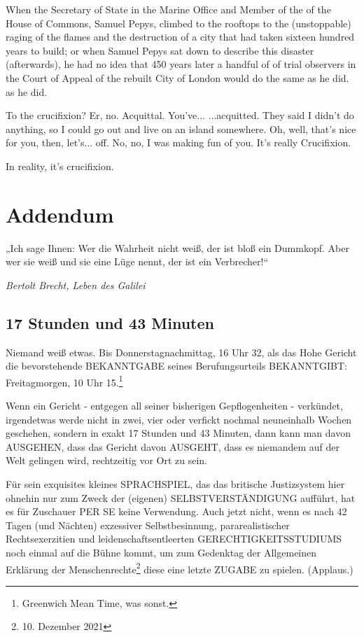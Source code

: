 \begin{multicols}{2}
When the Secretary of State in the Marine Office and Member of the
of the House of Commons, Samuel Pepys, climbed to the rooftops to
the (unstoppable) raging of the flames and the destruction of a city that had taken sixteen hundred years to build; or
when Samuel Pepys sat down to describe this disaster
(afterwards), he had no idea that 450 years later a handful of
of trial observers in the Court of Appeal of the rebuilt City of London would do the same as he did.
as he did.

To the crucifixion? Er, no. Acquittal. You've...
...acquitted. They said I didn't do anything,
so I could go out and live on an island somewhere. Oh, well, that's nice for you, then, let's...
off. No, no, I was making fun of you. It's really Crucifixion.

In reality, it's crucifixion.



\chapter{Addendum}

\epigraph{„Ich sage Ihnen: Wer die Wahrheit nicht weiß, der ist bloß ein Dummkopf. Aber wer sie weiß und sie eine Lüge nennt, der ist ein Verbrecher!“}{\textit{Bertolt Brecht, Leben des Galilei}}


\section{17 Stunden und 43 Minuten}

Niemand weiß etwas. Bis Donnerstagnachmittag, 16 Uhr
32, als das Hohe Gericht die bevorstehende BEKANNTGABE seines Berufungsurteils BEKANNTGIBT: Freitagmorgen, 10 Uhr 15.\footnote[25]{Greenwich Mean Time, was sonst.}

Wenn ein Gericht - entgegen all seiner bisherigen Gepflogenheiten - verkündet, irgendetwas werde nicht in
zwei, vier oder verfickt nochmal neuneinhalb Wochen
geschehen, sondern in exakt 17 Stunden und 43 Minuten, dann kann man davon AUSGEHEN, dass das Gericht davon AUSGEHT, dass es niemandem auf der Welt
gelingen wird, rechtzeitig vor Ort zu sein.

Für sein exquisites kleines SPRACHSPIEL, das das britische Justizsystem hier ohnehin nur zum Zweck der
(eigenen) SELBSTVERSTÄNDIGUNG aufführt, hat es für
Zuschauer PER SE keine Verwendung. Auch jetzt nicht,
wenn es nach 42 Tagen (und Nächten) exzessiver Selbstbesinnung, pararealistischer Rechtsexerzitien und leidenschaftsentleerten
GERECHTIGKEITSSTUDIUMS
noch einmal auf die Bühne kommt, um zum Gedenktag
der Allgemeinen Erklärung der Menschenrechte\footnote[26]{10. Dezember 2021} diese
eine letzte ZUGABE zu spielen. (Applaus.)


\end{multicols}
